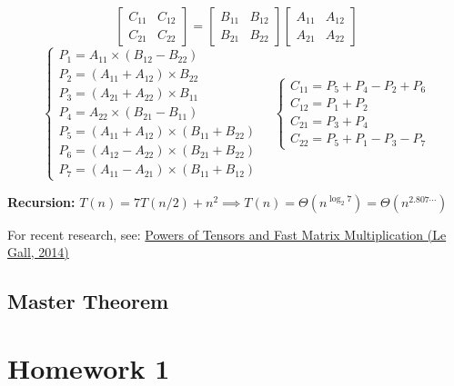 \documentclass[10pt]{article}
\begin{document}
$$
\left[
\begin{matrix}
	C_{11} & C_{12}\\
	C_{21} & C_{22}
\end{matrix}
\right]
=
\left[
\begin{matrix}
	B_{11} & B_{12}\\
	B_{21} & B_{22}
\end{matrix}
\right]
\left[
\begin{matrix}
	A_{11} & A_{12}\\
	A_{21} & A_{22}
\end{matrix}
\right]
$$
$$
\begin{cases}
	P_1 = A_{11} \times (B_{12}-B_{22})\\
	P_2 = (A_{11}+A_{12}) \times B_{22}\\
	P_3 = (A_{21}+A_{22}) \times B_{11}\\
	P_4 = A_{22} \times (B_{21}-B_{11})\\
	P_5 = (A_{11}+A_{12}) \times (B_{11}+B_{22})\\
	P_6 = (A_{12}-A_{22}) \times (B_{21}+B_{22})\\
	P_7 = (A_{11}-A_{21}) \times (B_{11}+B_{12})
\end{cases}
\quad
\begin{cases}
	C_{11} = P_5+P_4-P_2+P_6\\
	C_{12} = P_1+P_2\\
	C_{21} = P_3+P_4\\
	C_{22} = P_5+P_1-P_3-P_7
\end{cases}
$$

\textbf{Recursion:} $T(n) = 7T(n/2) + n^2 \implies T(n) = \Theta(n^{\log_2 7}) = \Theta(n^{2.807\cdots})$

For recent research, see: \href{https://arxiv.org/abs/1401.7714}{Powers of Tensors and Fast Matrix Multiplication (Le Gall, 2014)}

\subsection{Master Theorem}









\newpage

\section*{Homework 1}
\end{document}
